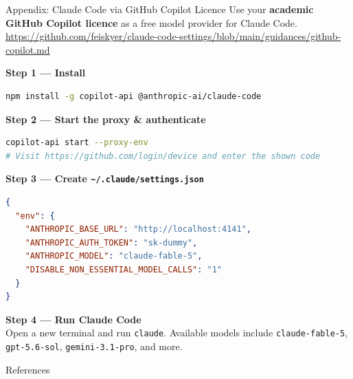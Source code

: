 \documentclass[aspectratio=169, 10pt]{beamer}
\newcommand{\model}[1]{\texttt{#1}}
\begin{document}
\begin{frame}[fragile]{Appendix: Claude Code via GitHub Copilot Licence}
  \scriptsize
  Use your \textbf{academic GitHub Copilot licence} as a free model provider for Claude Code.\\[0.2em]
  \url{https://github.com/feiskyer/claude-code-settings/blob/main/guidances/github-copilot.md}

  \smallskip
  \textbf{Step 1 — Install}
  \begin{lstlisting}[language=bash, numbers=none, basicstyle=\ttfamily\tiny, aboveskip=1pt, belowskip=2pt]
npm install -g copilot-api @anthropic-ai/claude-code
  \end{lstlisting}

  \textbf{Step 2 — Start the proxy \& authenticate}
  \begin{lstlisting}[language=bash, numbers=none, basicstyle=\ttfamily\tiny, aboveskip=1pt, belowskip=2pt]
copilot-api start --proxy-env
# Visit https://github.com/login/device and enter the shown code
  \end{lstlisting}

  \textbf{Step 3 — Create \texttt{\textasciitilde/.claude/settings.json}}
  \begin{lstlisting}[language=json, numbers=none, basicstyle=\ttfamily\tiny, aboveskip=1pt, belowskip=2pt]
{
  "env": {
    "ANTHROPIC_BASE_URL": "http://localhost:4141",
    "ANTHROPIC_AUTH_TOKEN": "sk-dummy",
    "ANTHROPIC_MODEL": "claude-fable-5",
    "DISABLE_NON_ESSENTIAL_MODEL_CALLS": "1"
  }
}
  \end{lstlisting}

  \textbf{Step 4 — Run Claude Code}\\[0.1em]
  Open a new terminal and run \texttt{claude}.
  Available models include \model{claude-fable-5}, \model{gpt-5.6-sol}, \model{gemini-3.1-pro}, and more.
\end{frame}

\begin{frame}[allowframebreaks]{References}
  \printbibliography[heading=none]
\end{frame}
\end{document}
